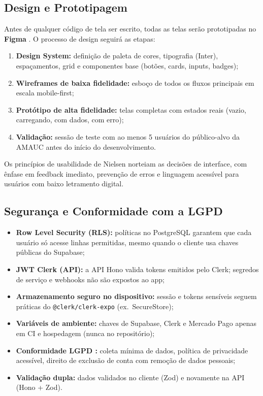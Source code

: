 \documentclass[12pt, a4paper]{article}
\begin{document}
\subsection{Design e Prototipagem}

Antes de qualquer código de tela ser escrito, todas as telas serão
prototipadas no \textbf{Figma} \cite{figma2024}. O processo de design
seguirá as etapas:

\begin{enumerate}
  \item \textbf{Design System:} definição de paleta de cores,
        tipografia (Inter), espaçamentos, grid e componentes base
        (botões, cards, inputs, badges);
  \item \textbf{Wireframes de baixa fidelidade:} esboço de todos os
        fluxos principais em escala mobile-first;
  \item \textbf{Protótipo de alta fidelidade:} telas completas com
        estados reais (vazio, carregando, com dados, com erro);
  \item \textbf{Validação:} sessão de teste com ao menos 5 usuários
        do público-alvo da AMAUC antes do início do desenvolvimento.
\end{enumerate}

Os princípios de usabilidade de Nielsen \cite{nielsen1990} norteiam
as decisões de interface, com ênfase em feedback imediato, prevenção
de erros e linguagem acessível para usuários com baixo letramento
digital.

\subsection{Segurança e Conformidade com a LGPD}

\begin{itemize}
  \item \textbf{Row Level Security (RLS):} políticas no PostgreSQL
        garantem que cada usuário só acesse linhas permitidas, mesmo
        quando o cliente usa chaves públicas do Supabase;
  \item \textbf{JWT Clerk (API):} a API Hono valida tokens emitidos pelo
        Clerk; segredos de serviço e webhooks não são expostos ao app;
  \item \textbf{Armazenamento seguro no dispositivo:} sessão e tokens
        sensíveis seguem práticas do \texttt{@clerk/clerk-expo} (ex.\
        SecureStore);
  \item \textbf{Variáveis de ambiente:} chaves de Supabase, Clerk e
        Mercado Pago apenas em CI e hospedagem (nunca no repositório);
  \item \textbf{Conformidade LGPD \cite{lgpd2018}:} coleta mínima de
        dados, política de privacidade acessível, direito de exclusão
        de conta com remoção de dados pessoais;
  \item \textbf{Validação dupla:} dados validados no cliente (Zod) e
        novamente na API (Hono + Zod).
\end{itemize}
\end{document}

